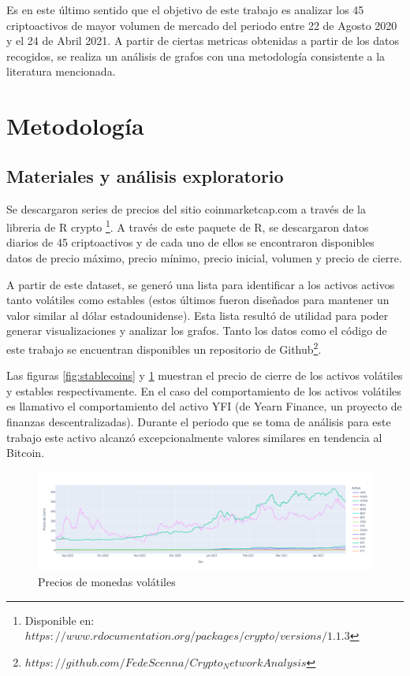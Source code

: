 \documentclass[runningheads,a4paper,10pt]{etc/llncs}
\let\stdsection\section
\renewcommand\section{\newpage\stdsection}
\begin{document}
Es en este último sentido que el objetivo de este trabajo es analizar los 45 criptoactivos de mayor volumen de mercado del periodo entre 22 de Agosto 2020 y el 24 de Abril 2021. A partir de ciertas metricas obtenidas a partir de los datos recogidos, se realiza un análisis de grafos con una metodología consistente a la literatura mencionada.

\section{Metodología}

\subsection{Materiales y análisis exploratorio}
 Se descargaron
series de precios del sitio coinmarketcap.com a través de la libreria de R crypto \footnote{Disponible en: $https://www.rdocumentation.org/packages/crypto/versions/1.1.3$}. A través de este paquete de R, se descargaron datos diarios de 45 criptoactivos y de cada uno de ellos se encontraron disponibles datos de precio máximo, precio mínimo, precio inicial, volumen y precio de cierre.


A partir de este dataset, se generó una lista para identificar a los activos activos tanto volátiles como estables (estos últimos fueron diseñados para mantener un valor similar al dólar estadounidense). Esta lista resultó de utilidad para poder generar visualizaciones y analizar los grafos.
Tanto los datos como el código de este trabajo se encuentran disponibles un repositorio de Github\footnote{$https://github.com/FedeScenna/Crypto_NetworkAnalysis$}.

Las figuras \ref{fig:stablecoins} y \ref{fig:volatile} muestran el precio de cierre de los activos volátiles y estables respectivamente.  En el caso del comportamiento de los activos volátiles es llamativo el comportamiento del activo YFI (de Yearn Finance, un proyecto de finanzas descentralizadas). Durante el periodo que se toma de análisis para este trabajo este activo alcanzó excepcionalmente valores similares en tendencia al Bitcoin.


\begin{figure}[htp]
    \centering
    \includegraphics[scale=0.3]{images/volatilecoins_lineplot.png}
    \caption{Precios de monedas volátiles}
    \label{fig:volatile}
\end{figure}
\end{document}
